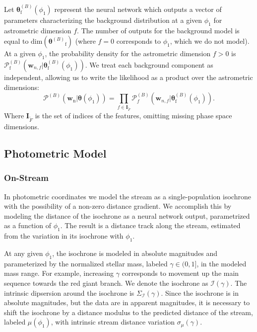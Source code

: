 \documentclass[twocolumn]{aastex631}
\newcommand{\mrm}[1]{\mathrm{#1}}
\newcommand{\mbs}[1]{\boldsymbol{#1}}
\newcommand{\mcal}[1]{\mathcal{#1}}
\newcommand{\pdf}{\mcal{P}}
\newcommand{\nth}[1]{{#1}_{\mrm{n}}}  %
\newcommand{\fth}[1]{{#1}_{\mrm{f}}}  %
\newcommand{\smallcomponent}[2]{#2^{\scriptscriptstyle (#1)}}
\newcommand{\cmp}[2]{\smallcomponent{#1}{#2}}
\newcommand{\Bcmp}[1]{\cmp{B}{#1}}
\begin{document}
            Let $\Bcmp{\fth{\mbs{\theta}}}(\phi_1)$ represent the neural network which outputs a vector of parameters characterizing the background distribution at a given $\phi_1$ for astrometric dimension $f$. The number of outputs for the background model is equal to $\mathrm{dim}\left(\fth{\Bcmp{\mbs{\theta}}}\right)$ (where $f=0$ corresponds to $\phi_1$, which we do not model). At a given $\phi_1$, the probability density for the astrometric dimension $f>0$ is $\Bcmp{\fth{\pdf}}\left(\mbs{w}_{n,f} | \Bcmp{\fth{\mbs{\theta}}}(\phi_1) \right)$. We treat each background component as independent, allowing us to write the likelihood as a product over the astrometric dimensions:
            \begin{equation} \label{eq:astrometric_model_off_stream_probability}
                \pdf^{(B)}\left(\nth{\mbs{w}} | \mbs{\theta}(\phi_1) \right) = \prod_{f\in \mbs{I}_{\tilde{F}}} \pdf_f^{(B)}\left(\mbs{w}_{n,f} | \Bcmp{\fth{\mbs{\theta}}}(\phi_1) \right).
            \end{equation}
            Where $\mbs{I}_{\tilde{F}}$ is the set of indices of the features, omitting missing phase space dimensions.
        


    \subsection{Photometric Model} \label{sub:photometric_model}

        \subsubsection{On-Stream} \label{sub:photometric_model_on_stream}
            In photometric coordinates we model the stream as a single-population isochrone with the possibility of a non-zero distance gradient. We accomplish this by modeling the distance of the isochrone as a neural network output, parametrized as a function of $\phi_1$. The result is a distance track along the stream, estimated from the variation in its isochrone with $\phi_1$. 
            
            At any given $\phi_1$, the isochrone is modeled in absolute magnitudes
            and parameterized by the normalized stellar mass, labeled $\gamma \in (0, 1]$, in the modeled mass range. For example, increasing $\gamma$ corresponds to movement up the main sequence towards the red giant branch. We denote the isochrone as $\mcal{I(\gamma)}$. The intrinsic dipsersion around the isochrone is $\Sigma_\mcal{I}(\gamma)$. Since the isochrone is in absolute magnitudes, but the data are in apparent magnitudes,
            it is necessary to shift the isochrone by a distance modulus to the predicted distance of the stream, labeled  $\mu(\phi_1)$, with intrinsic stream distance variation $\sigma_\mu(\gamma)$.
            
\end{document}
